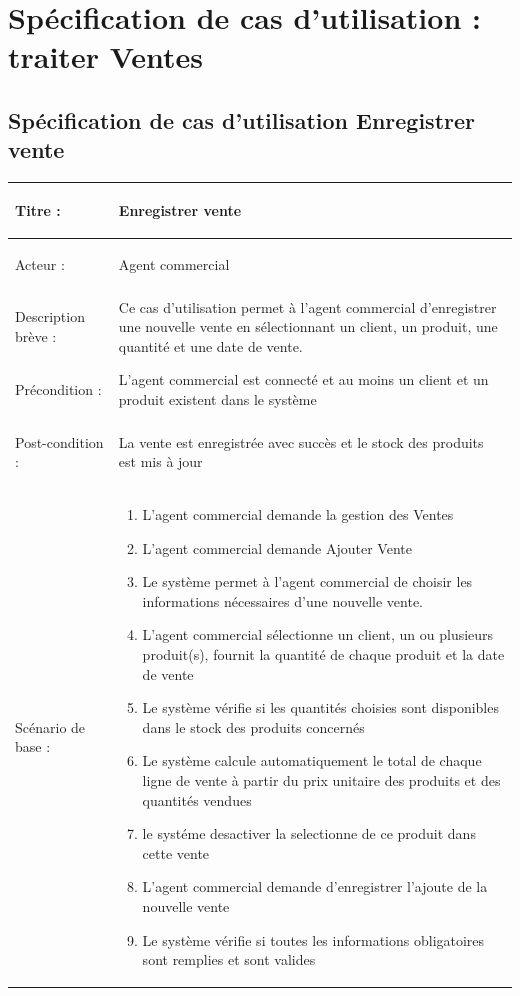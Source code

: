 \section{Spécification de cas d'utilisation : traiter Ventes}

\subsection{Spécification de cas d'utilisation Enregistrer vente}

\begin{longtable}{|>{\bfseries\raggedright\arraybackslash}p{3.5cm}|p{\dimexpr\textwidth-3.5cm-4\tabcolsep-2\arrayrulewidth}|}
\hline
Titre : & Enregistrer vente \\
\hline
Acteur : & Agent commercial \\
\hline
Description brève : & Ce cas d'utilisation permet à l'agent commercial d'enregistrer une nouvelle vente en sélectionnant un client, un produit, une quantité et une date de vente. \\
\hline
Précondition : & L'agent commercial est connecté et au moins un client et un produit existent dans le système \\
\hline
Post-condition : & La vente est enregistrée avec succès et le stock des produits est mis à jour \\
\hline
Scénario de base : &
\begin{enumerate}[leftmargin=1.5em, topsep=2pt, itemsep=1pt]
  \item L'agent commercial demande la gestion des Ventes
  \item L'agent commercial demande Ajouter Vente
  \item Le système permet à l'agent commercial de choisir les informations nécessaires d'une nouvelle vente.
  \item L'agent commercial sélectionne un client, un ou plusieurs produit(s), fournit la quantité de chaque produit et la date de vente
  \item Le système vérifie si les quantités choisies sont disponibles dans le stock des produits concernés
  \item Le système calcule automatiquement le total de chaque  ligne de vente à partir du prix unitaire des produits et des quantités vendues
  \item le systéme desactiver la selectionne de ce produit dans cette vente
  \item L'agent commercial demande d'enregistrer l'ajoute de la nouvelle vente
  \item Le système vérifie si toutes les informations obligatoires sont remplies et sont valides

\end{enumerate}
\end{longtable}
